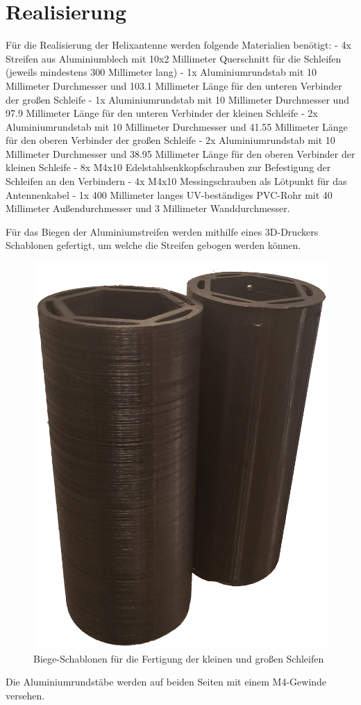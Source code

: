\section{Realisierung}
Für die Realisierung der Helixantenne werden folgende Materialien benötigt:\newline
- 4x Streifen aus Aluminiumblech mit 10x2 Millimeter Querschnitt für die Schleifen (jeweils mindestens 300 Millimeter lang)\newline
- 1x Aluminiumrundstab mit 10 Millimeter Durchmesser und 103.1 Millimeter Länge für den unteren Verbinder der großen Schleife\newline
- 1x Aluminiumrundstab mit 10 Millimeter Durchmesser und 97.9 Millimeter Länge für den unteren Verbinder der kleinen Schleife\newline
- 2x Aluminiumrundstab mit 10 Millimeter Durchmesser und 41.55 Millimeter Länge für den oberen Verbinder der großen Schleife\newline
- 2x Aluminiumrundstab mit 10 Millimeter Durchmesser und 38.95 Millimeter Länge für den oberen Verbinder der kleinen Schleife\newline
- 8x M4x10 Edelstahlsenkkopfschrauben zur Befestigung der Schleifen an den Verbindern\newline
- 4x M4x10 Messingschrauben als Lötpunkt für das Antennenkabel \newline
- 1x 400 Millimeter langes UV-beständiges PVC-Rohr mit 40 Millimeter Außendurchmesser und 3 Millimeter Wanddurchmesser.

Für das Biegen der Aluminiumstreifen werden mithilfe eines 3D-Druckers Schablonen gefertigt, um welche die Streifen gebogen werden können. 

\begin{figure} [H]
	\centering
	\includegraphics[width=.25\linewidth]{../ref/qfh_biegschablone.png}
	\caption{Biege-Schablonen für die Fertigung der kleinen und großen Schleifen}
	\label{fig:schablonen_qha}
\end{figure}

Die Aluminiumrundstäbe werden auf beiden Seiten mit einem M4-Gewinde versehen.

